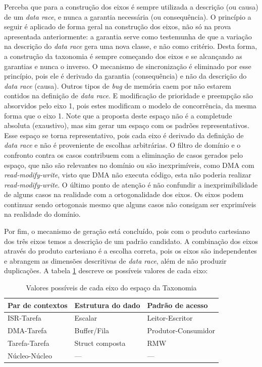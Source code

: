 Perceba que para a construção dos eixos é sempre utilizada a descrição (ou causa) de um \textit{data race}, e nunca a garantia necessária (ou consequência). O princípio a seguir é aplicado de forma geral na construção dos eixos, não só na prova apresentada anteriormente: a garantia serve como testemunha de que a variação na descrição do \textit{data race} gera uma nova classe, e não como critério. Desta forma, a construção da taxonomia é sempre começando dos eixos e se alcançando as garantias e nunca o inverso. O mecanismo de sincronização é eliminado por esse princípio, pois ele é derivado da garantia (consequência) e não da descrição do \textit{data race} (causa). Outros tipos de \textit{bug} de memória caem por não estarem contidos na definição de \textit{data race}. E modificação de prioridade e preempção são absorvidos pelo eixo 1, pois estes modificam o modelo de concorrência, da mesma forma que o eixo 1. Note que a proposta deste espaço não é a completude absoluta (exaustivo), mas sim gerar um espaço com os padrões representativos. Esse espaço se torna representativo, pois cada eixo é derivado da definição de \textit{data race} e não é proveniente de escolhas arbitrárias. O filtro de domínio e o confronto contra os casos contribuem com a eliminação de casos gerados pelo espaço, que não são relevantes no domínio ou são inexprimíveis, como \ac{DMA} com \textit{read-modify-write}, visto que \ac{DMA} não executa código, esta não poderia realizar \textit{read-modify-write}. O último ponto de atenção é não confundir a inexprimibilidade de alguns casos na realidade com a ortogonalidade dos eixos. Os eixos podem continuar sendo ortogonais mesmo que alguns casos não consigam ser exprimíveis na realidade do domínio.

Por fim, o mecanismo de geração está concluído, pois com o produto cartesiano dos três eixos temos a descrição de um padrão candidato. A combinação dos eixos através do produto cartesiano é a escolha correta, pois os eixos são independentes e abrangem as dimensões descritivas de \textit{data race}, além de não produzir duplicações. A tabela \ref{tab:eixos-dr} descreve os possíveis valores de cada eixo:

\begin{table}[ht]
  \centering
  \caption{Valores possíveis de cada eixo do espaço da Taxonomia}
  \label{tab:eixos-dr}
  \begin{tabular}{lll}
    \toprule
    Par de contextos & Estrutura do dado & Padrão de acesso \\
    \midrule
    ISR-Tarefa & Escalar & Leitor-Escritor \\
    DMA-Tarefa & Buffer/Fila & Produtor-Consumidor \\
    Tarefa-Tarefa & Struct composta & RMW \\
    Núcleo-Núcleo & ---  & --- \\
    \bottomrule
  \end{tabular}
\end{table}

